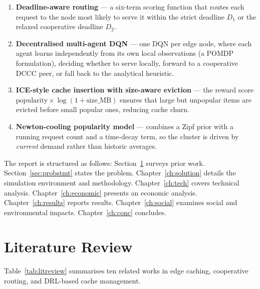 \documentclass[12pt,a4paper]{report}
\begin{document}
\begin{enumerate}
  \item \textbf{Deadline-aware routing} --- a six-term scoring function that routes each request
        to the node most likely to serve it within the strict deadline $D_1$ or the relaxed
        cooperative deadline $D_2$.
  \item \textbf{Decentralised multi-agent DQN} --- one DQN per edge node, where each agent
        learns independently from its own local observations (a POMDP formulation), deciding
        whether to serve locally, forward to a cooperative DCCC peer, or fall back to the
        analytical heuristic.
  \item \textbf{ICE-style cache insertion with size-aware eviction} --- the reward score
        $\text{popularity} \times \log(1 + \text{size\_MB})$ ensures that large but unpopular
        items are evicted before small popular ones, reducing cache churn.
  \item \textbf{Newton-cooling popularity model} --- combines a Zipf prior with a running
        request count and a time-decay term, so the cluster is driven by \emph{current} demand
        rather than historic averages.
\end{enumerate}

The report is structured as follows: Section~\ref{sec:litreview} surveys prior work.
Section~\ref{sec:probstmt} states the problem. Chapter~\ref{ch:solution} details the
simulation environment and methodology. Chapter~\ref{ch:tech} covers technical analysis.
Chapter~\ref{ch:economic} presents an economic analysis. Chapter~\ref{ch:results} reports
results. Chapter~\ref{ch:social} examines social and environmental impacts. Chapter~\ref{ch:conc}
concludes.

\section{Literature Review}
\label{sec:litreview}

Table~\ref{tab:litreview} summarises ten related works in edge caching, cooperative routing,
and DRL-based cache management.
\end{document}
